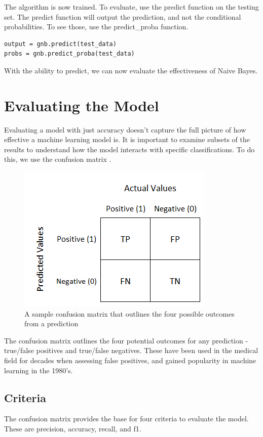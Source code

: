 \documentclass[11pt, twoside, reqno]{book}
\begin{document}
The algorithm is now trained. To evaluate, use the predict function on the testing set. The predict function will output the prediction, and not the conditional probabilities. To see those, use the predict\_proba function. 
\begin{verbatim}
output = gnb.predict(test_data)
probs = gnb.predict_proba(test_data)
\end{verbatim}
With the ability to predict, we can now evaluate the effectiveness of Naive Bayes. 
 
\section{Evaluating the Model}
\hspace{0.2in} Evaluating a model with just accuracy doesn't capture the full picture of how effective a machine learning model is. It is important to examine subsets of the results to understand how the model interacts with specific classifications. To do this, we use the confusion matrix \cite{fawcett}. 

\begin{figure}[H]
\label{fig:confmatrix}
\centering
	\includegraphics[scale=0.5]{confusion_matrix}
	\caption{A sample confusion matrix that outlines the four possible outcomes from a prediction}\label{fig:confusion_matrix}
\end{figure}

The confusion matrix outlines the four potential outcomes for any prediction - true/false positives and true/false negatives. These have been used in the medical field for decades when assessing false positives, and gained popularity in machine learning in the 1980's\cite{fawcett}. 

\subsection{Criteria}
\label{subsec:criteria}
\hspace{0.2in} The confusion matrix provides the base for four criteria to evaluate the model. These are precision, accuracy, recall, and f1\cite{vader, fawcett}.
\end{document}
